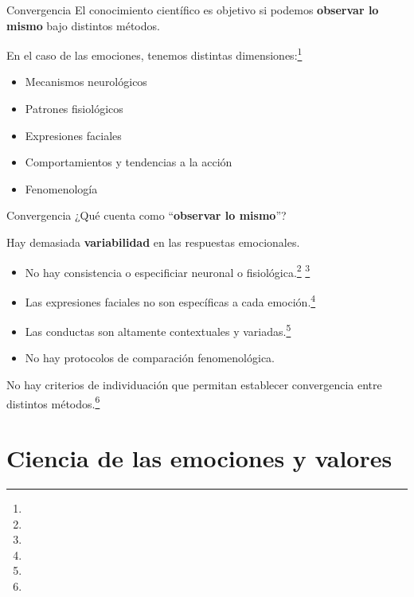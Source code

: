 \documentclass[%
            9pt,
                spanish, %
                    ignorenonframetext,
                aspectratio=169, %
        ]{beamer}
\providecommand{\tightlist}{}
\begin{document}
\begin{frame}{Convergencia}
\label{convergencia}
El conocimiento científico es objetivo si podemos \textbf{observar lo
mismo} bajo distintos métodos.

\pause

En el caso de las emociones, tenemos distintas
dimensiones:\footnote[frame]{}

\pause

\begin{itemize}
\tightlist
\item
  Mecanismos neurológicos \pause
\item
  Patrones fisiológicos \pause
\item
  Expresiones faciales \pause
\item
  Comportamientos y tendencias a la acción \pause
\item
  Fenomenología
\end{itemize}
\end{frame}

\begin{frame}{Convergencia}
\label{convergencia-1}
¿Qué cuenta como ``\textbf{observar lo mismo}''?

\pause

Hay demasiada \textbf{variabilidad} en las respuestas emocionales.

\pause

\begin{itemize}
\tightlist
\item
  No hay consistencia o especificiar neuronal o
  fisiológica.\footnote[frame]{} \footnote[frame]{}
  \pause
\item
  Las expresiones faciales no son específicas a cada
  emoción.\footnote[frame]{} \pause
\item
  Las conductas son altamente contextuales y
  variadas.\footnote[frame]{} \pause
\item
  No hay protocolos de comparación fenomenológica.
\end{itemize}

\pause

No hay criterios de individuación que permitan establecer convergencia
entre distintos métodos.\footnote[frame]{}
\end{frame}

\section{Ciencia de las emociones y
valores}\label{ciencia-de-las-emociones-y-valores}
\end{document}
